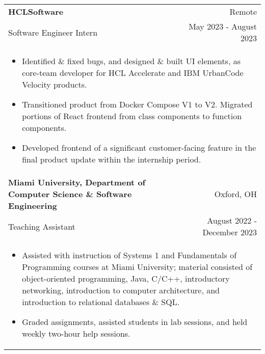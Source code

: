 \documentclass[letterpaper,10pt]{article} %
\begin{document}
\begin{tabular*}{\linewidth}{@{\extracolsep{\fill}} lr }
\textbf{HCLSoftware} & \footnotesize{Remote}\\
\footnotesize{Software Engineer Intern} & \footnotesize{May 2023 - August 2023}\\
\multicolumn{2}{p{\linewidth}}{
    \scriptsize{\vspace{-3.25mm}\begin{itemize}
        \item Identified \& fixed bugs, and designed \& built UI elements, as core-team developer for HCL Accelerate and IBM UrbanCode Velocity products.
        \item Transitioned product from Docker Compose V1 to V2. Migrated portions of React frontend from class components to function components.
        \item Developed frontend of a significant customer-facing feature in the final product update within the internship period.
    \end{itemize}}
}\\

\textbf{Miami University, Department of Computer Science \& Software Engineering} & \footnotesize{Oxford, OH}\\
\footnotesize{Teaching Assistant} & \footnotesize{August 2022 - December 2023}\\
\multicolumn{2}{p{\linewidth}}{
    \scriptsize{\vspace{-3.25mm}\begin{itemize}
        \item Assisted with instruction of Systems 1 and Fundamentals of Programming courses at Miami University; material consisted of object-oriented programming, Java, C/C++, introductory networking, introduction to computer architecture, and introduction to relational databases \& SQL.
        \item Graded assignments, assisted students in lab sessions, and held weekly two-hour help sessions.
    \end{itemize}}
}\\


\end{tabular*}
\end{document}
